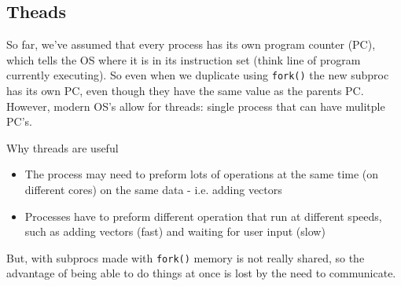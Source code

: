 \documentclass[a4paper, 10pt]{article}
\begin{document}
\subsection{Theads}
So far, we've assumed that every process has its own program counter (PC), which tells the OS where it is in its instruction set (think line of program currently executing). So even when we duplicate using \texttt{fork()} the new subproc has its own PC, even though they have the same value as the parents PC. \\[2ex]
However, modern OS's allow for threads: single process that can have mulitple PC's.

\begin{conceptbox}{Why threads are useful}{}
    \begin{itemize}
        \item The process may need to preform lots of operations at the same time (on different cores) on the same data - i.e. adding vectors
        \item Processes have to preform different operation that run at different speeds, such as adding vectors (fast) and waiting for user input (slow)
    \end{itemize}
\end{conceptbox}
But, with subprocs made with \texttt{fork()} memory is not really shared, so the advantage of being able to do things at once is lost by the need to communicate.
\pagebreak
\end{document}
